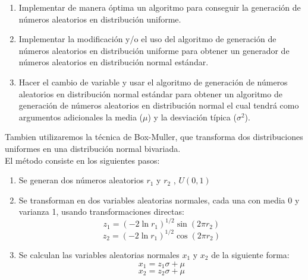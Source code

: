 \documentclass[conference,a4paper]{IEEEtran}
\begin{document}
\begin{enumerate}
	\item Implementar de manera \'optima un algoritmo para conseguir la generaci\'on de n\'umeros aleatorios en distribuci\'on uniforme. 
	\item Implementar la modificaci\'on y/o el uso del algoritmo de generaci\'on de n\'umeros aleatorios en distribuci\'on uniforme para obtener un generador de n\'umeros aleatorios en distribuci\'on normal est\'andar.
	\item Hacer el cambio de variable y usar el algoritmo de generaci\'on de n\'umeros aleatorios en distribuci\'on normal est\'andar para obtener un algoritmo de generaci\'on de n\'umeros aleatorios en distribuci\'on normal el cual tendr\'a como argumentos adicionales la media ($\mu$) y la desviaci\'on t\'ipica ($\sigma^2$).
	
\end{enumerate}
Tambien utilizaremos la t\'ecnica de Box-Muller, que transforma dos distribuciones uniformes en una distribuci\'on normal bivariada.\\
El m\'etodo consiste en los siguientes pasos:
\begin{enumerate}
	\item Se generan dos n\'umeros aleatorios $r_{1}$ y $r_{2}$ , $U(0,1)$
	\item Se transforman en dos variables aleatorias normales, cada	una con media 0 y varianza 1, usando transformaciones directas:\\
	\begin{equation}
	z_{1}=(-2\ln r_{1})^{1/2} \sin (2\pi r_{2})
	\end{equation}
	\begin{equation}
	z_{2}=(-2\ln r_{1})^{1/2} \cos (2\pi r_{2})
	\end{equation}
	\item Se calculan las variables aleatorias normales $x_{1}$ y $x_{2}$ de la siguiente forma:\\
	\begin{equation}
	x_{1}=z_{1}\sigma + \mu
	\end{equation}
	\begin{equation}
	x_{2}=z_{2}\sigma + \mu
	\end{equation}
\end{enumerate}
\end{document}
